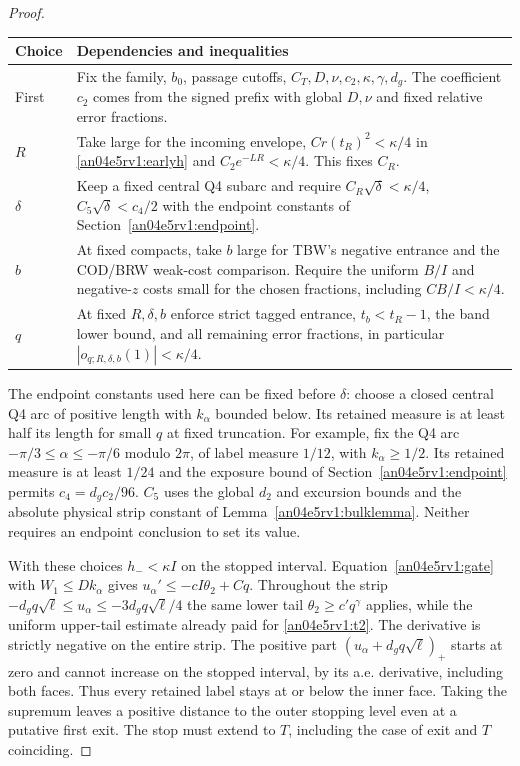 \documentclass[11pt]{article}
\begin{document}
\begin{proof}
\begin{center}\small
\begin{tabular}{p{.14\linewidth}p{.76\linewidth}}
Choice & Dependencies and inequalities\\ \hline
First & Fix the family, $b_0$, passage cutoffs, $C_T,D,\nu,c_2,\kappa,\gamma,d_g$. The coefficient $c_2$ comes from the signed prefix with global $D,\nu$ and fixed relative error fractions.\\
$R$ & Take large for the incoming envelope, $Cr(t_R)^2<\kappa/4$ in \eqref{an04e5rv1:earlyh} and $C_2e^{-LR}<\kappa/4$. This fixes $C_R$.\\
$\delta$ & Keep a fixed central Q4 subarc and require $C_R\sqrt\delta<\kappa/4$, $C_5\sqrt\delta<c_4/2$ with the endpoint constants of Section~\ref{an04e5rv1:endpoint}.\\
$b$ & At fixed compacts, take $b$ large for TBW's negative entrance and the COD/BRW weak-cost comparison. Require the uniform $B/I$ and negative-$z$ costs small for the chosen fractions, including $CB/I<\kappa/4$.\\
$q$ & At fixed $R,\delta,b$ enforce strict tagged entrance, $t_b<t_R-1$, the band lower bound, and all remaining error fractions, in particular $|o_{q;R,\delta,b}(1)|<\kappa/4$.\\
\end{tabular}
\end{center}
The endpoint constants used here can be fixed before $\delta$: choose a closed central Q4 arc of positive length with $k_\alpha$ bounded below. Its retained measure is at least half its length for small $q$ at fixed truncation. For example, fix the Q4 arc $-\pi/3\le\alpha\le-\pi/6$ modulo $2\pi$, of label measure $1/12$, with $k_\alpha\ge1/2$. Its retained measure is at least $1/24$ and the exposure bound of Section~\ref{an04e5rv1:endpoint} permits $c_4=d_gc_2/96$. $C_5$ uses the global $d_2$ and excursion bounds and the absolute physical strip constant of Lemma~\ref{an04e5rv1:bulklemma}. Neither requires an endpoint conclusion to set its value.

With these choices $h_-<\kappa I$ on the stopped interval. Equation~\eqref{an04e5rv1:gate} with $W_1\le Dk_\alpha$ gives $u_\alpha'\le-c I\theta_2+Cq$. Throughout the strip $-d_g q\sqrt\ell\le u_\alpha\le-3d_g q\sqrt\ell/4$ the same lower tail $\theta_2\ge c' q^\gamma$ applies, while the uniform upper-tail estimate already paid for \eqref{an04e5rv1:t2}. The derivative is strictly negative on the entire strip. The positive part $(u_\alpha+d_g q\sqrt\ell)_+$ starts at zero and cannot increase on the stopped interval, by its a.e. derivative, including both faces. Thus every retained label stays at or below the inner face. Taking the supremum leaves a positive distance to the outer stopping level even at a putative first exit. The stop must extend to $T$, including the case of exit and $T$ coinciding.
\end{proof}
\end{document}
